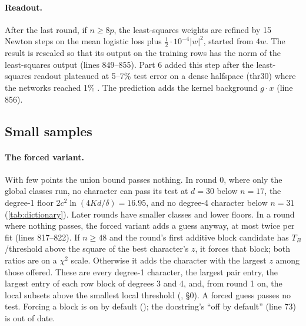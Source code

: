 \paragraph{Readout.} After the last round, if $n\ge8p$, the least-squares weights are refined by 15 Newton steps on the mean logistic loss plus $\frac12\cdot10^{-4}|w|^2$, started from $4w$. The result is rescaled so that its output on the training rows has the norm of the least-squares output (lines 849--855). Part 6 added this step after the least-squares readout plateaued at 5--7\% test error on a dense halfspace (thr30) where the networks reached 1\% \cite{discretelearners2026}. The prediction adds the kernel background $g\cdot x$ (line 856).

\subsection{Small samples}\label{app:learner-smalln}

\paragraph{The forced variant.} With few points the union bound passes nothing. In round 0, where only the global classes run, no character can pass its test at $d=30$ below $n=17$, the degree-1 floor $2c^2\ln(4Kd/\delta)=16.95$, and no degree-4 character below $n=31$ (\cref{tab:dictionary}). Later rounds have smaller classes and lower floors. In a round where nothing passes, the forced variant adds a guess anyway, at most twice per fit (lines 817--822). If $n\ge48$ and the round's first additive block candidate has $T_B$/threshold above the square of the best character's $z$, it forces that block; both ratios are on a $\chi^2$ scale. Otherwise it adds the character with the largest $z$ among those offered. These are every degree-1 character, the largest pair entry, the largest entry of each row block of degrees 3 and 4, and, from round 1 on, the local subsets above the smallest local threshold (, \S0). A forced guess passes no test. Forcing a block is on by default (); the docstring's ``off by default'' (line 73) is out of date.

